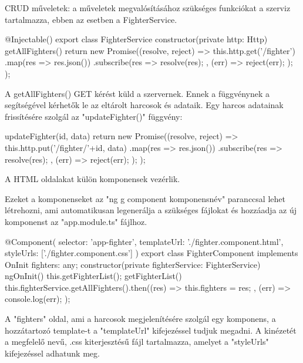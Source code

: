 
CRUD műveletek: a műveletek megvalósításához szükséges funkciókat a szerviz tartalmazza, ebben az esetben a FighterService.

\begin{cpp}
@Injectable()
export class FighterService {
  constructor(private http: Http) { }
  getAllFighters() {
    return new Promise((resolve, reject) => {
      this.http.get('/fighter')
        .map(res => res.json())
        .subscribe(res => {
          resolve(res);
        }, (err) => {
          reject(err);
        });
    });  }  }
\end{cpp}

A getAllFighters() GET kérést küld a szervernek. Ennek a függvénynek a segítségével kérhetők le az eltárolt harcosok és adataik.
Egy harcos adatainak frissítésére szolgál az "updateFighter()" függvény:

\begin{cpp}
updateFighter(id, data) {
    return new Promise((resolve, reject) => {
        this.http.put('/fighter/'+id, data)
          .map(res => res.json())
          .subscribe(res => {
            resolve(res);
          }, (err) => {
            reject(err);
          });
    });
  }
\end{cpp}

A HTML oldalakat külön komponensek vezérlik.

Ezeket a komponenseket az "ng g component komponensnév" paranccsal lehet létrehozni, ami automatikusan legenerálja a szükséges fájlokat és hozzáadja az új komponenst az "app.module.ts" fájlhoz.

\begin{cpp}
@Component({
  selector: 'app-fighter',
  templateUrl: './fighter.component.html',
  styleUrls: ['./fighter.component.css']
})
export class FighterComponent implements OnInit {
  fighters: any;
  constructor(private fighterService: FighterService) { }
  ngOnInit() {
    this.getFighterList();
  }
  getFighterList() {
    this.fighterService.getAllFighters().then((res) => {
      this.fighters = res;
    }, (err) => {
      console.log(err);
    });}}
\end{cpp}

A "fighters" oldal, ami a harcosok megjelenítésére szolgál egy komponens, a hozzátartozó template-t a "templateUrl" kifejezéssel tudjuk megadni. A kinézetét a megfelelő nevű, .css kiterjesztésű fájl tartalmazza, amelyet a "styleUrls" kifejezéssel adhatunk meg.

